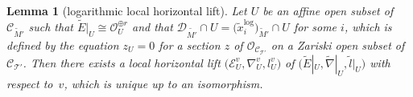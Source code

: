 \documentclass[pdftex]{sigma}
\numberwithin{equation}{section}
\newtheorem{Lemma}[Theorem]{Lemma}
\begin{document}
\begin{Lemma}[logarithmic local horizontal lift]
\label{lemma: local horizontal lift of regular singular connection}
Let $U$ be an affine open subset of ${\mathcal C}_{\tilde{M}'}$
such that
$\tilde{E}|_U\cong{\mathcal O}_U^{\oplus r}$
and that ${\mathcal D}_{\tilde{M'}}\cap U=\big(\tilde{x}^{\mathrm{log}}_i\big)_{\tilde{M}'}\cap U$
for some $i$, which is defined by the equation $z_U=0$
for a section $z$ of ${\mathcal O}_{{\mathcal C}_{\mathcal T'}}$
on a Zariski open subset of ${\mathcal C}_{\mathcal T'}$.
Then there exists a local horizontal lift
$\big({\mathcal E}^v_U,\nabla^v_U, l^v_U\big)$
of
$\big(\tilde{E}|_U,\tilde{\nabla}|_U,\tilde{l}|_U\big)$
with respect to~$v$,
which is unique up to an isomorphism.
\end{Lemma}
\end{document}
